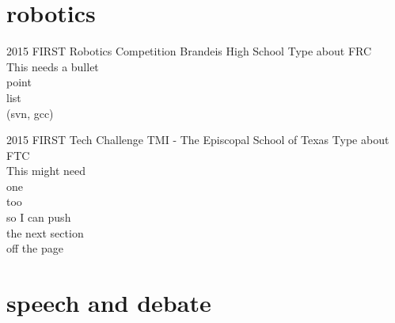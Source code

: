 \documentclass[]{friggeri-cv} %
\begin{document}

\section{robotics}

\begin{entrylist}


\entry
{2015}
{FIRST Robotics Competition}
{Brandeis High School}
{\color{red}Type about FRC \\ This needs a bullet \\ point \\ list \\ (svn, gcc)}


\entry
{2015}
{FIRST Tech Challenge}
{TMI - The Episcopal School of Texas}
{\color{red}Type about FTC \\ This might need \\ one \\ too \\ so I can push \\ the next section \\ off the page}


\end{entrylist}


\section{speech and debate}
\end{document}
